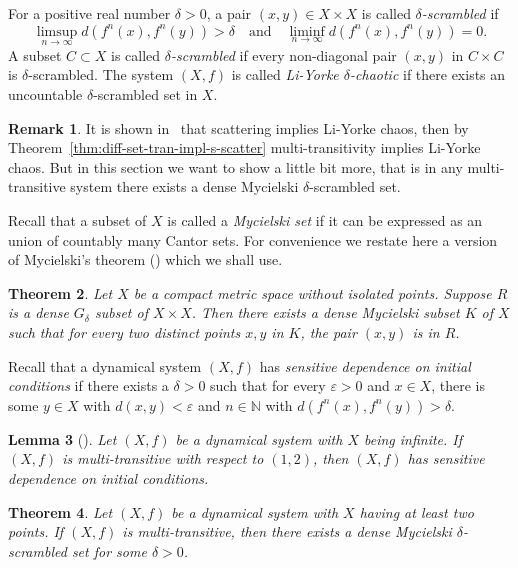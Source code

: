\documentclass[12pt,a4paper]{amsart}
\newtheorem{thm}{Theorem}[section]
\newtheorem{lem}[thm]{Lemma}
\theoremstyle{definition}
\newtheorem{rem}[thm]{Remark}
\numberwithin{equation}{section}
\begin{document}
For a positive real number $\delta>0$, a pair $(x, y)\in X\times X$ is called \emph{$\delta$-scrambled} if
\[\limsup_{n\to\infty}d(f^{n}(x), f^{n}(y))>\delta\quad\text{and}\quad
 \liminf_{n\rightarrow \infty}d(f^{n}(x), f^{n}(y))=0.\]
A subset $C\subset X$ is called \emph{$\delta$-scrambled}
if every non-diagonal pair $(x,y)$ in $C\times C$ is $\delta$-scrambled.
The system $(X,f)$ is called \emph{Li-Yorke $\delta$-chaotic}
if there exists an uncountable $\delta$-scrambled set in $X$.

\begin{rem}
It is shown in~\cite{W-Huang-X-Ye-2002} that scattering implies Li-Yorke chaos,
then by Theorem~\ref{thm:diff-set-tran-impl-s-scatter}
multi-transitivity implies Li-Yorke chaos.
But in this section we want to show a little bit more, that is in any multi-transitive system
there exists a dense Mycielski $\delta$-scrambled set.
\end{rem}

Recall that a subset of $X$ is called a \emph{Mycielski set} if it can be  expressed
as an union of countably many Cantor sets. For  convenience we restate here a
version of Mycielski's theorem (\cite[Theorem~1]{M64}) which we shall use.

\begin{thm}\label{thm:Mycielski-thm}
Let $X$ be a compact metric space without isolated points.
Suppose $R$ is a dense $G_\delta$ subset of $X\times X$.
Then there exists a dense  Mycielski subset $K$ of $X$ such that
for every two distinct points $x,y$ in $K$, the pair $(x,y)$ is in  $R$.
\end{thm}

Recall that a dynamical system $(X, f)$ has \emph{sensitive dependence on initial conditions}
if there exists a $\delta>0$ such that for every  $\varepsilon>0$ and $x\in X$,
there is some $y\in X$ with $d(x,y)<\varepsilon$ and $n\in \mathbb{N}$ with
$d(f^{n}(x), f^{n}(y))>\delta$.

\begin{lem}[\cite{Moothathu-2010}]\label{lem:(1,2)-tran-impl-sensitive}
Let $(X, f)$ be a dynamical system with $X$ being infinite.
If $(X,f)$ is multi-transitive with respect to $(1,2)$,
then  $(X,f)$ has sensitive dependence on initial conditions.
\end{lem}

\begin{thm}\label{thm:mul-tran-impl-deta-Mycie-scram}
Let $(X, f)$ be a dynamical system with $X$ having at least two points.
If $(X,f)$ is multi-transitive, then there exists a dense Mycielski $\delta$-scrambled set for some $\delta>0$.
\end{thm}
\end{document}
